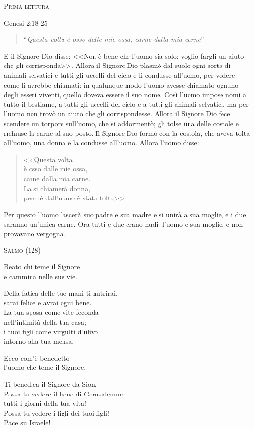 \documentclass[12pt,twoside]{article}
\newcommand{\masssubpart}[1]{\bigskip

  {\large\scshape #1}}
\newcommand{\reading}[1]{#1}
\newcommand{\readingquote}[1]{
\begin{quote}
``\textit{#1}''
\end{quote}
}
\begin{document}
{\newpage

\masssubpart{Prima lettura}

\reading{Genesi 2:18-25}
\readingquote{Questa volta è osso dalle mie ossa, carne dalla mia carne}

E il Signore Dio disse: <<Non è bene che l'uomo sia solo: voglio fargli un aiuto che gli corrisponda>>. Allora il Signore Dio plasmò dal suolo ogni sorta di animali selvatici e tutti gli uccelli del cielo e li condusse all'uomo, per vedere come li avrebbe chiamati: in qualunque modo l'uomo avesse chiamato ognuno degli esseri viventi, quello doveva essere il suo nome. Così l'uomo impose nomi a tutto il bestiame, a tutti gli uccelli del cielo e a tutti gli animali selvatici, ma per l'uomo non trovò un aiuto che gli corrispondesse. Allora il Signore Dio fece scendere un torpore sull'uomo, che si addormentò; gli tolse una delle costole e richiuse la carne al suo posto. Il Signore Dio formò con la costola, che aveva tolta all'uomo, una donna e la condusse all'uomo. Allora l'uomo disse:
\begin{quote}
<<Questa volta\\
è osso dalle mie ossa,\\
carne dalla mia carne.\\
La si chiamerà donna,\\
perché dall'uomo è stata tolta>>
\end{quote}
Per questo l'uomo lascerà suo padre e sua madre e si unirà a sua moglie, e i due saranno un'unica carne.
Ora tutti e due erano nudi, l'uomo e sua moglie, e non provavano vergogna.

\newpage

\masssubpart{Salmo (128)}

Beato chi teme il Signore\\
e cammina nelle sue vie.

Della fatica delle tue mani ti nutrirai,\\
sarai felice e avrai ogni bene.\\
La tua sposa come vite feconda\\
nell'intimità della tua casa;\\
i tuoi figli come virgulti d'ulivo\\
intorno alla tua mensa.

Ecco com'è benedetto\\
l'uomo che teme il Signore.

Ti benedica il Signore da Sion.\\
Possa tu vedere il bene di Gerusalemme\\
tutti i giorni della tua vita!\\
Possa tu vedere i figli dei tuoi figli!\\
Pace su Israele!

}
\end{document}
